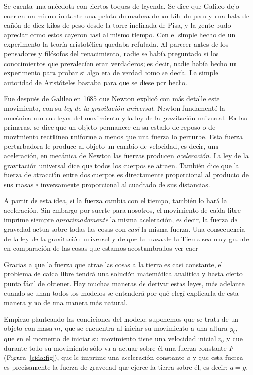 Se cuenta una anécdota con ciertos toques de leyenda.
Se dice que Galileo dejo caer en un mismo instante una pelota de madera de un kilo de peso y una bala de cañón de diez kilos de peso desde la torre inclinada de Pisa, y la gente pudo apreciar como estos cayeron casi al mismo tiempo.
Con el simple hecho de un experimento la teoría aristotélica quedaba refutada.
Al parecer antes de los pensadores y filósofos del renacimiento, nadie se había preguntado si los conocimientos que prevalecían eran verdaderos; es decir, nadie había hecho un experimento para probar si algo era de verdad como se decía.
La simple autoridad de Aristóteles bastaba para que se diese por hecho.

Fue después de Galileo en 1685 que Newton explicó con más detalle este movimiento, con su \emph{ley de la gravitación universal}.
Newton fundamentó la mecánica con sus leyes del movimiento y la ley de la gravitación universal.
En las primeras, se dice que un objeto permanece en su estado de reposo o de movimiento rectilíneo uniforme a menos que una fuerza lo perturbe.
Esta fuerza perturbadora le produce al objeto un cambio de velocidad, es decir, una aceleración, en mecánica de Newton las fuerzas producen \emph{aceleración}.
La ley de la gravitación universal dice que todos los cuerpos se atraen.
También dice que la fuerza de atracción entre dos cuerpos es directamente proporcional al producto de sus masas e inversamente proporcional al cuadrado de sus distancias.

A partir de esta idea, si la fuerza cambia con el tiempo, también lo hará la aceleración.
Sin embargo por suerte para nosotros, el movimiento de caída libre imprime siempre \emph{aproximadamente} la misma aceleración, es decir, la fuerza de gravedad actua sobre todas las cosas con \emph{casi} la misma fuerza.
Una consecuencia de la ley de la gravitación universal y de que la masa de la Tierra sea muy grande en comparación de las cosas que estamos acostumbrados ver caer.

Gracias a que la fuerza que atrae las cosas a la tierra es casi constante, el problema de caída libre tendrá una solución matemática analítica y hasta cierto punto fácil de obtener.
Hay muchas maneras de derivar estas leyes, más adelante cuando se unan todos los modelos se entenderá por qué elegí explicarla de esta manera y no de una manera más natural.

Empiezo planteando las condiciones del modelo: suponemos que se trata de un objeto con masa $m$, que se encuentra al iniciar su movimiento a una altura $y_0$, que en el momento de iniciar su movimiento tiene una velocidad inicial $v_0$ y que durante todo su movimiento sólo va a actuar sobre él una fuerza constante $F$ (Figura~\ref{cida:fig}), que le imprime una aceleración constante $a$ y que esta fuerza es precisamente la fuerza de gravedad que ejerce la tierra sobre él, es decir: $a = g$.

